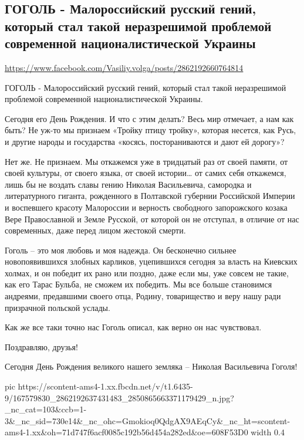  
 
 
 
 

\subsection{ГОГОЛЬ - Малороссийский русский гений, который стал такой неразрешимой проблемой современной националистической Украины}
\url{https://www.facebook.com/Vasiliy.volga/posts/2862192660764814}

ГОГОЛЬ - Малороссийский русский гений, который стал такой неразрешимой проблемой современной националистической Украины.

Сегодня его День Рождения. И что с этим делать? Весь мир отмечает, а нам как
быть? Не уж-то мы признаем «Тройку птицу тройку», которая несется, как Русь, и
другие народы и государства «косясь, постораниваются и дают ей дорогу»?

Нет же. Не признаем. Мы откажемся уже в тридцатый раз от своей памяти, от своей
культуры, от своего языка, от своей истории… от самих себя откажемся, лишь бы
не воздать славы гению Николая Васильевича, самородка и литературного гиганта,
рожденного в Полтавской губернии Российской Империи и воспевшего красоту
Малороссии и верность свободного запорожского козака Вере Православной и Земле
Русской, от которой он не отступал, в отличие от нас современных, даже перед
лицом жестокой смерти.

Гоголь – это моя любовь и моя надежда. Он бесконечно сильнее новопоявившихся
злобных карликов, уцепившихся сегодня за власть на Киевских холмах, и он
победит их рано или поздно, даже если мы, уже совсем не такие, как его Тарас
Бульба, не сможем их победить. Мы все больше становимся андреями, предавшими
своего отца, Родину, товарищество и веру нашу ради призрачной польской услады.

Как же все таки точно нас Гоголь описал, как верно он нас чувствовал.

Поздравляю, друзья! 

Сегодня День Рождения великого нашего земляка – Николая Васильевича Гоголя!


\ifcmt
  pic https://scontent-ams4-1.xx.fbcdn.net/v/t1.6435-9/167579830_2862192637431483_2850865663371179429_n.jpg?_nc_cat=103&ccb=1-3&_nc_sid=730e14&_nc_ohc=Gmokioq0QdgAX9AEqCy&_nc_ht=scontent-ams4-1.xx&oh=71d747f6acf0085c192b56d454a282ed&oe=608F53D0
  width 0.4
\fi

